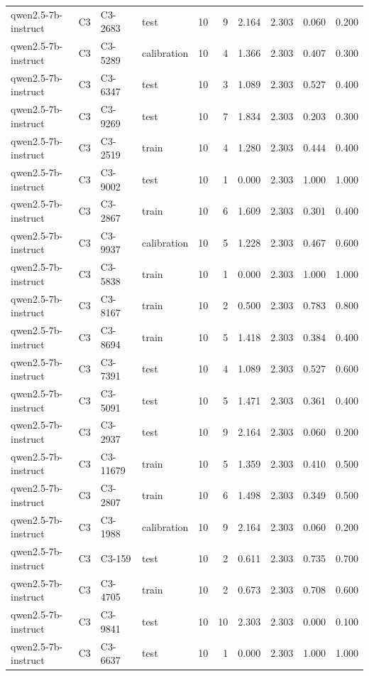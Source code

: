 \begin{table}
\begin{tabular}{llllrrrrrr}
qwen2.5-7b-instruct & C3 & C3-2683 & test & 10 & 9 & 2.164 & 2.303 & 0.060 & 0.200 \\
qwen2.5-7b-instruct & C3 & C3-5289 & calibration & 10 & 4 & 1.366 & 2.303 & 0.407 & 0.300 \\
qwen2.5-7b-instruct & C3 & C3-6347 & test & 10 & 3 & 1.089 & 2.303 & 0.527 & 0.400 \\
qwen2.5-7b-instruct & C3 & C3-9269 & test & 10 & 7 & 1.834 & 2.303 & 0.203 & 0.300 \\
qwen2.5-7b-instruct & C3 & C3-2519 & train & 10 & 4 & 1.280 & 2.303 & 0.444 & 0.400 \\
qwen2.5-7b-instruct & C3 & C3-9002 & test & 10 & 1 & 0.000 & 2.303 & 1.000 & 1.000 \\
qwen2.5-7b-instruct & C3 & C3-2867 & train & 10 & 6 & 1.609 & 2.303 & 0.301 & 0.400 \\
qwen2.5-7b-instruct & C3 & C3-9937 & calibration & 10 & 5 & 1.228 & 2.303 & 0.467 & 0.600 \\
qwen2.5-7b-instruct & C3 & C3-5838 & train & 10 & 1 & 0.000 & 2.303 & 1.000 & 1.000 \\
qwen2.5-7b-instruct & C3 & C3-8167 & train & 10 & 2 & 0.500 & 2.303 & 0.783 & 0.800 \\
qwen2.5-7b-instruct & C3 & C3-8694 & train & 10 & 5 & 1.418 & 2.303 & 0.384 & 0.400 \\
qwen2.5-7b-instruct & C3 & C3-7391 & test & 10 & 4 & 1.089 & 2.303 & 0.527 & 0.600 \\
qwen2.5-7b-instruct & C3 & C3-5091 & test & 10 & 5 & 1.471 & 2.303 & 0.361 & 0.400 \\
qwen2.5-7b-instruct & C3 & C3-2937 & test & 10 & 9 & 2.164 & 2.303 & 0.060 & 0.200 \\
qwen2.5-7b-instruct & C3 & C3-11679 & train & 10 & 5 & 1.359 & 2.303 & 0.410 & 0.500 \\
qwen2.5-7b-instruct & C3 & C3-2807 & train & 10 & 6 & 1.498 & 2.303 & 0.349 & 0.500 \\
qwen2.5-7b-instruct & C3 & C3-1988 & calibration & 10 & 9 & 2.164 & 2.303 & 0.060 & 0.200 \\
qwen2.5-7b-instruct & C3 & C3-159 & test & 10 & 2 & 0.611 & 2.303 & 0.735 & 0.700 \\
qwen2.5-7b-instruct & C3 & C3-4705 & train & 10 & 2 & 0.673 & 2.303 & 0.708 & 0.600 \\
qwen2.5-7b-instruct & C3 & C3-9841 & test & 10 & 10 & 2.303 & 2.303 & 0.000 & 0.100 \\
qwen2.5-7b-instruct & C3 & C3-6637 & test & 10 & 1 & 0.000 & 2.303 & 1.000 & 1.000 \\

\end{tabular}
\end{table}
